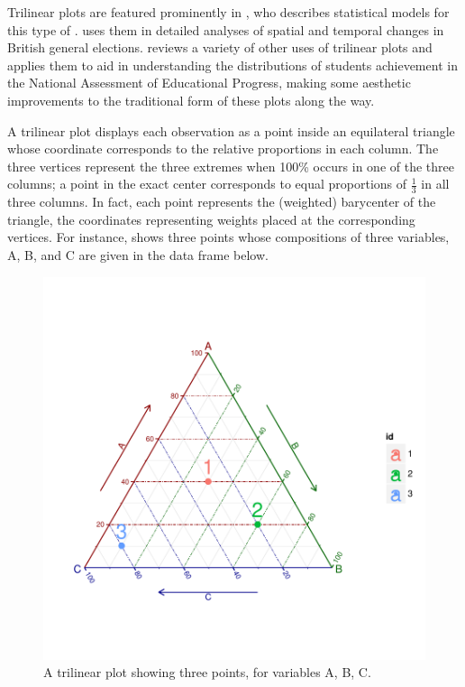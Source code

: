 \documentclass[10pt,krantz2]{krantz}\usepackage[]{graphicx}\usepackage[]{color}
\newenvironment{knitrout}{}{} %
\renewenvironment{knitrout}{\small\renewcommand{\baselinestretch}{.85}}{} %
\begin{document}
Trilinear plots are featured prominently in \citet{Aitchison:86},
who describes statistical models for this type of
.  \citet{Upton:76,Upton:94}
uses them in detailed analyses of spatial and temporal changes in
British general elections.
\citet{Wainer:96} reviews a variety of other uses of trilinear
plots and applies them to aid in understanding the distributions
of students achievement in the
National Assessment of Educational Progress,
making some aesthetic improvements to the traditional form of these
plots along the way.

A trilinear plot displays each observation as a point inside
an equilateral triangle whose coordinate corresponds to the
relative proportions in each column.
The three vertices represent the three extremes when 100\%
occurs in one of the three columns; a point in the exact
center corresponds to equal proportions of $\frac13$ in
all three columns.  In fact, each point represents the (weighted)
barycenter of the triangle, the coordinates representing weights
placed at the corresponding vertices. For instance, 
shows three points whose compositions of three variables,
A, B, and C are given in the data frame  below.
\begin{knitrout}
\color{fgcolor}\begin{figure}[!htbp]

\centerline{\includegraphics[width=.6\textwidth,trim=20 20 20 20,clip]{ch04/fig/tripdemo2-1} }

\caption[A trilinear plot showing three points, for variables A, B, C]{A trilinear plot showing three points, for variables A, B, C.\label{fig:tripdemo2}}
\end{figure}


\end{knitrout}
\end{document}
